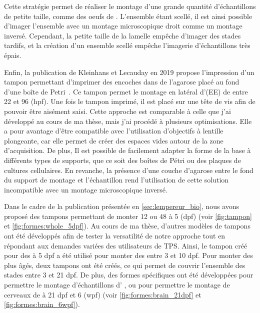 \documentclass[\main/main.tex]{subfiles}
\begin{document}
%
Cette stratégie permet de réaliser le montage d'une grande quantité d'échantillons de petite taille, comme des oeufs de \pz{}.
%
L'ensemble étant scellé, il est ainsi possible d'imager l'ensemble avec un montage microscopique droit comme un montage inversé.
%
Cependant, la petite taille de la lamelle empêche d'imager des stades tardifs, et la création d'un ensemble scellé empêche l'imagerie d'échantillons très épais.

Enfin, la publication de Kleinhans et Lecauday en 2019 propose l'impression d'un tampon permettant d'imprimer des encoches dans de l'agarose placé au fond d'une boîte de Petri~\cite{kleinhans_2019}.
%
Ce tampon permet le montage en latéral d'\ee (EE) de \pz{} entre 22 et 96 \hpf{} (hpf).
%
Une fois le tampon imprimé, il est placé sur une tête de vis afin de pouvoir être aisément saisi.
%
Cette approche est comparable à celle que j'ai développé au cours de ma thèse, mais j'ai procédé à plusieurs optimisations.
%
Elle a pour avantage d'être compatible avec l'utilisation d'objectifs à lentille plongeante, car elle permet de créer des espaces vides autour de la zone d'acquisition.
%
De plus, Il est possible de facilement adapter la forme de la base à différents types de supports, que ce soit des boîtes de Pétri ou des plaques de cultures cellulaires.
%
En revanche, la présence d'une couche d'agarose entre le fond du support de montage et l'échantillon rend l'utilisation de cette solution incompatible avec un montage microscopique inversé.

% 
Dans le cadre de la publication présentée en \autoref{sec:lempereur_bio},
nous avons proposé des tampons permettant de monter 12 ou 48 \pzs{} à 5 \dpf{} (dpf) 
(voir \autoref{fig:tampon} et \autoref{fig:formes:whole_5dpf}).
%
Au cours de ma thèse, d'autres modèles de tampons ont été développés afin de tester la versatilité de notre approche tout en répondant aux demandes variées des utilisateurs de TPS.
%
Ainsi, le tampon créé pour des \pzs{} à 5 dpf a été utilisé pour monter des \pzs{} entre 3 et 10 dpf.
%
Pour monter des \pzs{} plus âgés, deux tampons ont été créés, ce qui permet de
couvrir l'ensemble des stades entre 3 et 21 dpf.
%
De plus, des formes spécifiques ont été développées pour permettre le montage d'échantillons
d' \ol{}, ou pour permettre le montage de cerveaux de \pz{} à 21 dpf et 6 \wpf (wpf)
(voir \autoref{fig:formes:brain_21dpf} et \autoref{fig:formes:brain_6wpf}).
\end{document}
